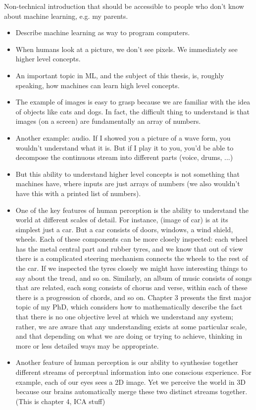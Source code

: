 Non-technical introduction that should be accessible to people who don't know about machine learning, e.g. my parents.
\begin{itemize}
\item Describe machine learning as way to program computers.
\item When humans look at a picture, we don't see pixels. We immediately see higher level concepts.
\item An important topic in ML, and the subject of this thesis, is, roughly speaking, how machines can learn high level concepts. 
\item The example of images is easy to grasp because we are familiar with the idea of objects like cats and dogs. In fact, the difficult thing to understand is that images (on a screen) are fundamentally an array of numbers. 
\item Another example: audio. If I showed you a picture of a wave form, you wouldn't understand what it is. But if I play it to you, you'd be able to decompose the continuous stream into different parts (voice, drums, ...)
\item But this ability to understand higher level concepts is not something that machines have, where inputs are just arrays of numbers (we also wouldn't have this with a printed list of numbers).
\item One of the key features of human perception is the ability to understand the world at different scales of detail. For instance, (image of car) is at its simplest just a car. But a car consists of doors, windows, a wind shield, wheels. Each of these components can be more closely inspected: each wheel has the metal central part and rubber tyres, and we know that out of view there is a complicated steering mechanism connects the wheels to the rest of the car. If we inspected the tyres closely we might have interesting things to say about the tread, and so on. Similarly, an album of music consists of songs that are related, each song consists of chorus and verse, within each of these there is a progression of chords, and so on. Chapter 3 presents the first major topic of my PhD, which considers how to mathematically describe the fact that there is no one objective level at which we understand any system; rather, we are aware that any understanding exists at some particular scale, and that depending on what we are doing or trying to achieve, thinking in more or less detailed ways may be appropriate.
\item Another feature of human perception is our ability to synthesise together different streams of perceptual information into one conscious experience. For example, each of our eyes sees a 2D image. Yet we perceive the world in 3D because our brains automatically merge these two distinct streams together. (This is chapter 4, ICA stuff)

\end{itemize}
